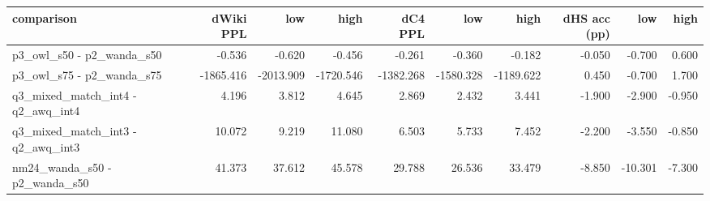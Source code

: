 \begin{tabular}{lrrrrrrrrr}
\toprule
comparison & dWiki PPL & low & high & dC4 PPL & low & high & dHS acc (pp) & low & high \\
\midrule
p3\_owl\_s50 - p2\_wanda\_s50 & -0.536 & -0.620 & -0.456 & -0.261 & -0.360 & -0.182 & -0.050 & -0.700 & 0.600 \\
p3\_owl\_s75 - p2\_wanda\_s75 & -1865.416 & -2013.909 & -1720.546 & -1382.268 & -1580.328 & -1189.622 & 0.450 & -0.700 & 1.700 \\
q3\_mixed\_match\_int4 - q2\_awq\_int4 & 4.196 & 3.812 & 4.645 & 2.869 & 2.432 & 3.441 & -1.900 & -2.900 & -0.950 \\
q3\_mixed\_match\_int3 - q2\_awq\_int3 & 10.072 & 9.219 & 11.080 & 6.503 & 5.733 & 7.452 & -2.200 & -3.550 & -0.850 \\
nm24\_wanda\_s50 - p2\_wanda\_s50 & 41.373 & 37.612 & 45.578 & 29.788 & 26.536 & 33.479 & -8.850 & -10.301 & -7.300 \\
\bottomrule
\end{tabular}
